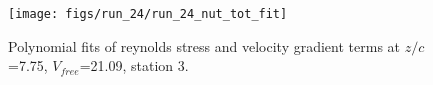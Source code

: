 \begin{figure}[H]
\centering
\texttt{[image: figs/run\_24/run\_24\_nut\_tot\_fit]}
\caption{Polynomial fits of reynolds stress and velocity gradient terms at $z/c$=7.75, $V_{free}$=21.09, station 3.}
\label{fig:run_24_nut_tot_fit}
\end{figure}


